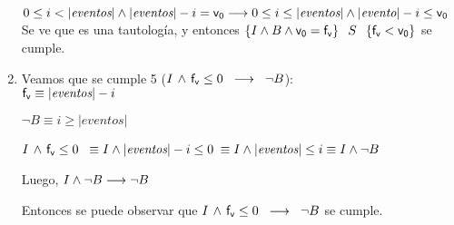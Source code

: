 \documentclass[10pt,a4paper]{article}
\begin{document}
\begin{enumerate}
        $0 \leq i < |{\textit{eventos}}\vert \land |{\textit{eventos}}\vert-i= \mathsf{v_{0}} \longrightarrow 0 \leq i \leq |{\textit{eventos}}\vert \land |\textit{evento}\vert - i \leq \mathsf{v_{0}}$\\

        Se ve que es una tautología, y entonces $\left\lbrace I \land B \land \mathsf{v_{0}} = \mathsf{f_{v}} \right\rbrace \hspace{2mm} S \hspace{2mm} \left\lbrace \mathsf{f_{v}} < \mathsf{v_{0}} \right\rbrace$ se cumple.

        \item Veamos que se cumple 5 ($I \hspace{0.5mm} \land \hspace{0.5mm} \mathsf{f_{v}} \leq 0  \hspace{2mm} \longrightarrow \hspace{2mm} \neg B$):\\
        
        $\mathsf{f_{v}} \equiv |\textit{eventos}\vert - i$

        $\neg B \equiv i \geq |{\textit{eventos}}\vert$

        $I \hspace{0.5mm} \land \hspace{0.5mm} \mathsf{f_{v}} \leq 0  \hspace{2mm} \equiv I \land  |\textit{eventos}\vert - i \leq 0 $
        $\equiv I \land |\textit{eventos}\vert \leq i \equiv I \land \neg B$

        Luego, $I \land \neg B \longrightarrow \neg B$

        Entonces se puede observar que $I \hspace{0.5mm} \land \hspace{0.5mm} \mathsf{f_{v}} \leq 0  \hspace{2mm} \longrightarrow \hspace{2mm} \neg B$ se cumple.
        

    \end{enumerate}
\end{document}
